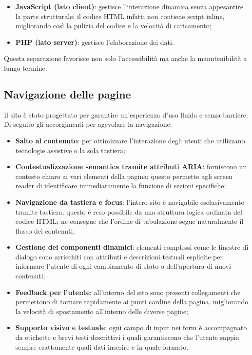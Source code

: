\documentclass[11pt,a4paper]{article}
\begin{document}
\begin{itemize}
  \item \textbf{JavaScript (lato client)}: gestisce l'interazione dinamica senza appesantire la parte strutturale; il codice HTML infatti non contiene script inline, migliorando cos\`i la pulizia del codice e la velocit\`a di caricamento;
  \item \textbf{PHP (lato server)}: gestisce l'elaborazione dei dati.
\end{itemize}

Questa separazione favorisce non solo l'accessibilit\`a ma anche la manutenibilit\`a a lungo termine.

\subsection{Navigazione delle pagine}
Il sito \`e stato progettato per garantire un'esperienza d'uso fluida e senza barriere. Di seguito gli accorgimenti per agevolare la navigazione:

\begin{itemize}
  \item \textbf{Salto al contenuto}: per ottimizzare l'interazione degli utenti che utilizzano tecnologie assistive o la sola tastiera;
  \item \textbf{Contestualizzazione semantica tramite attributi ARIA}: forniscono un contesto chiaro ai vari elementi della pagina; questo permette agli screen reader di identificare immediatamente la funzione di sezioni specifiche;
  \item \textbf{Navigazione da tastiera e focus}: l'intero sito \`e navigabile esclusivamente tramite tastiera; questo \`e reso possibile da una struttura logica ordinata del codice HTML; ne consegue che l'ordine di tabulazione segue naturalmente il flusso dei contenuti;
  \item \textbf{Gestione dei componenti dinamici}: elementi complessi come le finestre di dialogo sono arricchiti con attributi e descrizioni testuali esplicite per informare l'utente di ogni cambiamento di stato o dell'apertura di nuovi contenuti;
  \item \textbf{Feedback per l'utente}: all'interno del sito sono presenti collegamenti che permettono di tornare rapidamente ai punti cardine della pagina, migliorando la velocit\`a di spostamento all'interno delle diverse pagine;
  \item \textbf{Supporto visivo e testuale}: ogni campo di input nei form \`e accompagnato da etichette e brevi testi descrittivi i quali garantiscono che l'utente sappia sempre esattamente quali dati inserire e in quale formato.
\end{itemize}
\end{document}
